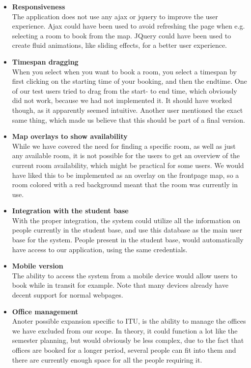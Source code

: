 \begin{itemize}
	\item \textbf{Responsiveness}\\
	The application does not use any ajax or jquery to improve the user experience. Ajax could have been used to avoid refreshing the page when e.g. selecting a room to book from the map. JQuery could have been used to create fluid animations, like sliding effects, for a better user experience. 
	
	\item \textbf{Timespan dragging}\\
	When you select when you want to book a room, you select a timespan by first clicking on the starting time of your booking, and then the endtime. One of our test users tried to drag from the start- to end time, which obviously did not work, because we had not implemented it. It should have worked though, as it apparently seemed intuitive. Another user mentioned the exact same thing, which made us believe that this should be part of a final version.
	
	\item \textbf{Map overlays to show availability}\\
	While we have covered the need for finding a specific room, as well as just any available room, it is not possible for the users to get an overview of the current room availability, which might be practical for some users. We would have liked this to be implemented as an overlay on the frontpage map, so a room colored with a red background meant that the room was currently in use.
	
	\item \textbf{Integration with the student base}\\
	With the proper integration, the system could utilize all the information on people currently in the student base, and use this database as the main user base for the system. People present in the student base, would automatically have access to our application, using the same credentials. 
	
	\item \textbf{Mobile version}\\
	The ability to access the system from a mobile device would allow users to book while in transit for example. Note that many devices already have decent support for normal webpages.
	
	\item \textbf{Office management}\\
	Anoter possible expansion specific to ITU, is the ability to manage the offices we have excluded from our scope. In theory, it could function a lot like the semester planning, but would obviously be less complex, due to the fact that offices are booked for a longer period, several people can fit into them and there are currently enough space for all the people requiring it.
	

\end{itemize}
